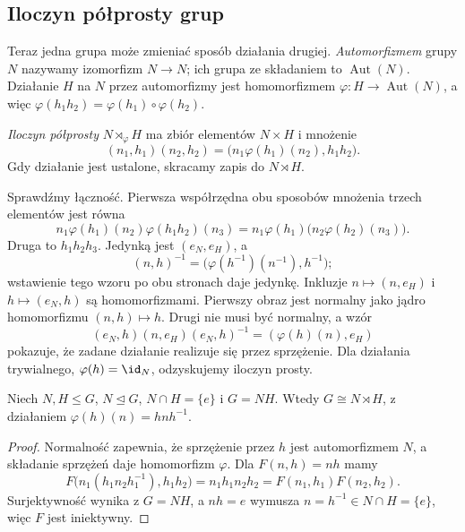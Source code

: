 \subsection*{Iloczyn półprosty grup}
\label{subsec:iloczyn-polprosty}

Teraz jedna grupa może zmieniać sposób działania drugiej.
\emph{Automorfizmem} grupy $N$ nazywamy izomorfizm $N\to N$;
ich grupa ze składaniem to $\operatorname{Aut}(N)$.
Działanie $H$ na $N$ przez automorfizmy jest homomorfizmem
$\varphi:H\to\operatorname{Aut}(N)$, a więc
$\varphi(h_1h_2)=\varphi(h_1)\circ\varphi(h_2)$.

\begin{definicja}
\emph{Iloczyn półprosty} $N\rtimes_\varphi H$ ma zbiór elementów
$N\times H$ i mnożenie
\[
 (n_1,h_1)(n_2,h_2)
 =\bigl(n_1\varphi(h_1)(n_2),h_1h_2\bigr).
\]
Gdy działanie jest ustalone, skracamy zapis do $N\rtimes H$.
\end{definicja}

Sprawdźmy łączność. Pierwsza współrzędna obu sposobów mnożenia
trzech elementów jest równa
\[
 n_1\varphi(h_1)(n_2)\varphi(h_1h_2)(n_3)
 =n_1\varphi(h_1)\bigl(n_2\varphi(h_2)(n_3)\bigr).
\]
Druga to $h_1h_2h_3$. Jedynką jest $(e_N,e_H)$, a
\[
 (n,h)^{-1}=\bigl(\varphi(h^{-1})(n^{-1}),h^{-1}\bigr);
\]
wstawienie tego wzoru po obu stronach daje jedynkę.
Inkluzje $n\mapsto(n,e_H)$ i $h\mapsto(e_N,h)$ są homomorfizmami.
Pierwszy obraz jest normalny jako jądro homomorfizmu
$(n,h)\mapsto h$. Drugi nie musi być normalny, a wzór
\[
 (e_N,h)(n,e_H)(e_N,h)^{-1}=(\varphi(h)(n),e_H)
\]
pokazuje, że zadane działanie realizuje się przez sprzężenie.
Dla działania trywialnego, $\varphi(h)=\id_N$, odzyskujemy iloczyn prosty.

\begin{stwierdzenie}
Niech $N,H\leq G$, $N\trianglelefteq G$, $N\cap H=\{e\}$ i $G=NH$.
Wtedy $G\cong N\rtimes H$, z działaniem $\varphi(h)(n)=hnh^{-1}$.
\end{stwierdzenie}
\begin{proof}
Normalność zapewnia, że sprzężenie przez $h$ jest automorfizmem $N$,
a składanie sprzężeń daje homomorfizm $\varphi$.
Dla $F(n,h)=nh$ mamy
\[
 F\bigl(n_1(h_1n_2h_1^{-1}),h_1h_2\bigr)
 =n_1h_1n_2h_2=F(n_1,h_1)F(n_2,h_2).
\]
Surjektywność wynika z $G=NH$, a $nh=e$ wymusza
$n=h^{-1}\in N\cap H=\{e\}$, więc $F$ jest iniektywny.
\end{proof}

